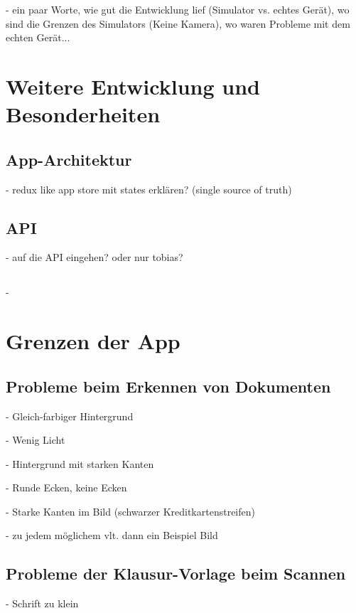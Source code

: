 \documentclass[nomenclature, 150]{HSMW-Thesis}
\begin{document}
	- ein paar Worte, wie gut die Entwicklung lief (Simulator vs. echtes Gerät), wo sind die Grenzen des Simulators (Keine Kamera), wo waren Probleme mit dem echten Gerät...
	



\chapter{Weitere Entwicklung und Besonderheiten}

	\section{App-Architektur}
		- redux like app store mit states erklären? (single source of truth)
	
	\section{API}
		- auf die API eingehen? oder nur tobias?
	
	\section{}
		- 




\chapter{Grenzen der App}
	\section{Probleme beim Erkennen von Dokumenten}
		- Gleich-farbiger Hintergrund
			
		- Wenig Licht
		
		- Hintergrund mit starken Kanten
		
		- Runde Ecken, keine Ecken
		
		- Starke Kanten im Bild (schwarzer Kreditkartenstreifen)
		
		- zu jedem möglichem vlt. dann ein Beispiel Bild
		
	\section{Probleme der Klausur-Vorlage beim Scannen}
		- Schrift zu klein
		
\end{document}
